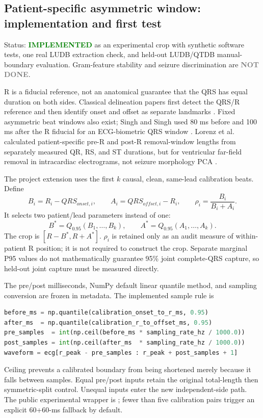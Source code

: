 \documentclass[11pt,a4paper]{article}
\newcommand{\implemented}{\textcolor{green}{\textbf{IMPLEMENTED}}}
\newcommand{\notdone}{\textcolor{gray}{\textbf{NOT DONE}}}
\newcommand{\pathcode}[1]{\texttt{\detokenize{#1}}}
\begin{document}
\subsection{Patient-specific asymmetric window: implementation and first test}
\label{sec:asymmetricproposal}

Status: \implemented{} as an experimental crop with synthetic software tests,
one real LUDB extraction check, and held-out LUDB/QTDB manual-boundary
evaluation. Gram-feature stability and seizure discrimination are \notdone.

R is a fiducial reference, not an anatomical guarantee that the QRS has equal
duration on both sides. Classical delineation papers first detect the QRS/R
reference and then identify onset and offset as separate landmarks
\cite{martinez2004,illanes2007,dimarco2011}. Fixed asymmetric beat windows also
exist; Singh and Singh used 80 ms before and 100 ms after the R fiducial for an
ECG-biometric QRS window \cite{singh2013}. Lorenz et al. calculated
patient-specific pre-R and post-R removal-window lengths from separately
measured QR, RS, and ST durations, but for ventricular far-field removal in
intracardiac electrograms, not seizure morphology PCA \cite{lorenz2021}.

The project extension uses the first $k$ causal, clean, same-lead
calibration beats. Define
\[
B_i=R_i-QRS_{onset,i},\qquad
A_i=QRS_{offset,i}-R_i,\qquad
\rho_i=\frac{B_i}{B_i+A_i}.
\]
It selects two patient/lead parameters instead of one:
\[
B^*=Q_{0.95}(B_1,\ldots,B_k),\qquad
A^*=Q_{0.95}(A_1,\ldots,A_k).
\]
The crop is $[R-B^*,R+A^*]$. $\rho_i$ is retained only as an audit
measure of within-patient R position; it is not required to construct the crop.
Separate marginal P95 values do not mathematically guarantee 95\% joint
complete-QRS capture, so held-out joint capture must be measured directly.

The pre/post milliseconds, NumPy default linear quantile method, and sampling
conversion are frozen in metadata. The implemented sample rule is
\begin{lstlisting}[language=Python]
before_ms = np.quantile(calibration_onset_to_r_ms, 0.95)
after_ms  = np.quantile(calibration_r_to_offset_ms, 0.95)
pre_samples  = int(np.ceil(before_ms * sampling_rate_hz / 1000.0))
post_samples = int(np.ceil(after_ms  * sampling_rate_hz / 1000.0))
waveform = ecg[r_peak - pre_samples : r_peak + post_samples + 1]
\end{lstlisting}
Ceiling prevents a calibrated boundary from being shortened merely because it
falls between samples. Equal pre/post inputs retain the original total-length
then symmetric-split control. Unequal inputs enter the new independent-side
path. The public experimental wrapper is
\pathcode{extract_patient_asymmetric_varon_morphology}; fewer than five
calibration pairs trigger an explicit 60+60-ms fallback by default.
\end{document}
